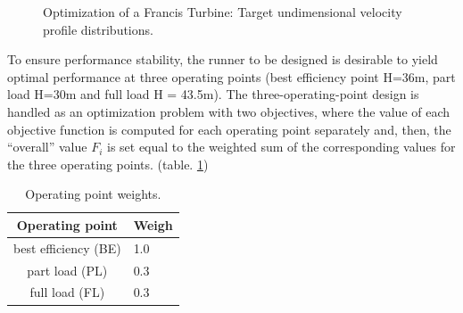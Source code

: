 \begin{figure}[h!]
\begin{minipage}[b]{1\linewidth}
 \centering
\end{minipage}
\caption{Optimization of a Francis Turbine: Target undimensional velocity profile distributions.}
\label{design-obj-tar}
\end{figure}


To ensure performance stability, the runner to be designed is desirable to yield optimal performance at three operating points (best efficiency point H=36m, part load H=30m and full load H = 43.5m). The three-operating-point design is handled as an optimization problem with two objectives, where the value of each objective function is computed for each operating point separately and, then, the “overall” value $F_i$ is set equal to the weighted sum of the corresponding values for the three operating points. (table. \ref{op-weights}) 

\begin{table}[h!]
\begin{center}
\begin{tabular}{ |c|l| }
\hline
Operating point& Weigh\\
\hline
best efficiency (BE)  & 1.0\\
\hline
part load (PL) & 0.3\\
\hline
full load (FL) & 0.3\\
\hline
\end{tabular}
\caption{Operating point weights.}
\label{op-weights}
\end{center}
\end{table}


